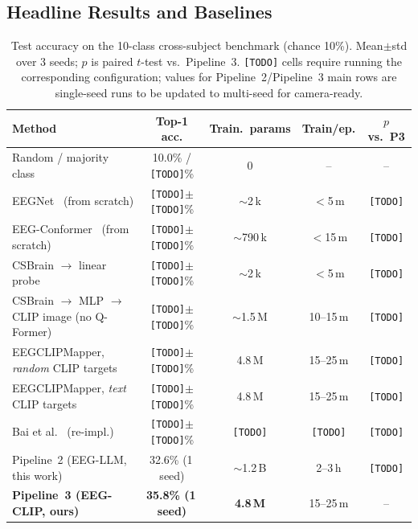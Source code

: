 \documentclass{article}
\begin{document}
\subsection{Headline Results and Baselines}
\label{sec:baselines}

\begin{table}[h]
  \centering
  \caption{Test accuracy on the 10-class cross-subject benchmark (chance 10\%). Mean$\pm$std over 3 seeds; $p$ is paired $t$-test vs.\ Pipeline~3. \texttt{[TODO]} cells require running the corresponding configuration; values for Pipeline~2/Pipeline~3 main rows are single-seed runs to be updated to multi-seed for camera-ready.}
  \label{tab:accuracy}
  \footnotesize
  \begin{tabular}{lcccc}
    \toprule
    \textbf{Method} & \textbf{Top-1 acc.} & \textbf{Train.\ params} & \textbf{Train/ep.} & \textbf{$p$ vs.\ P3} \\
    \midrule
    Random / majority class                                               & 10.0\% / \texttt{[TODO]}\%               & 0          & --          & -- \\
    EEGNet~\citep{lawhern2018eegnet} (from scratch)                        & \texttt{[TODO]}$\pm$\texttt{[TODO]}\%   & $\sim$2\,k & $<$5\,m   & \texttt{[TODO]} \\
    EEG-Conformer~\citep{song2023eegconformer} (from scratch)              & \texttt{[TODO]}$\pm$\texttt{[TODO]}\%   & $\sim$790\,k & $<$15\,m & \texttt{[TODO]} \\
    CSBrain $\to$ linear probe                                            & \texttt{[TODO]}$\pm$\texttt{[TODO]}\%   & $\sim$2\,k & $<$5\,m   & \texttt{[TODO]} \\
    CSBrain $\to$ MLP $\to$ CLIP image (no Q-Former)                      & \texttt{[TODO]}$\pm$\texttt{[TODO]}\%   & $\sim$1.5\,M & 10--15\,m & \texttt{[TODO]} \\
    EEGCLIPMapper, \emph{random} CLIP targets                              & \texttt{[TODO]}$\pm$\texttt{[TODO]}\%   & 4.8\,M     & 15--25\,m & \texttt{[TODO]} \\
    EEGCLIPMapper, \emph{text} CLIP targets                                & \texttt{[TODO]}$\pm$\texttt{[TODO]}\%   & 4.8\,M     & 15--25\,m & \texttt{[TODO]} \\
    Bai et al.~\citep{bai2023brain} (re-impl.)                            & \texttt{[TODO]}$\pm$\texttt{[TODO]}\%   & \texttt{[TODO]} & \texttt{[TODO]} & \texttt{[TODO]} \\
    Pipeline~2 (EEG-LLM, this work)                                        & 32.6\% (1\,seed)                         & $\sim$1.2\,B & 2--3\,h    & \texttt{[TODO]} \\
    \textbf{Pipeline~3 (EEG-CLIP, ours)}                                   & \textbf{35.8\% (1\,seed)}                & \textbf{4.8\,M} & 15--25\,m & --   \\
    \bottomrule
  \end{tabular}
\end{table}
\end{document}
